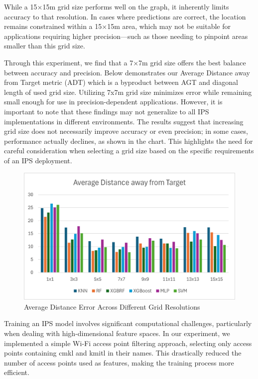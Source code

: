 \documentclass[conference]{IEEEtran}
\begin{document}
	While a 15×15m grid size performs well on the graph, it inherently limits accuracy to that resolution. In cases where predictions are correct, the location remains constrained within a 15×15m area, which may not be suitable for applications requiring higher precision—such as those needing to pinpoint areas smaller than this grid size.
	
	Through this experiment, we find that a 7×7m grid size offers the best balance between accuracy and precision. Below demonstrates our Average Distance away from Target metric (ADT) which is a byproduct between AGT and diagonal length of used grid size. Utilizing 7x7m grid size minimizes error while remaining small enough for use in precision-dependent applications. However, it is important to note that these findings may not generalize to all IPS implementations in different environments. The results suggest that increasing grid size does not necessarily improve accuracy or even precision; in some cases, performance actually declines, as shown in the chart. This highlights the need for careful consideration when selecting a grid size based on the specific requirements of an IPS deployment.
	
	
	\begin{figure}[htbp]
		\centerline{\includegraphics[scale=0.65]{image2.png}}
		\caption{Average Distance Error Across Different Grid Resolutions}
		\label{fig:Avg_dis_err}
	\end{figure}
	
	Training an IPS model involves significant computational challenges, particularly when dealing with high-dimensional feature spaces. In our experiment, we implemented a simple Wi-Fi access point filtering approach, selecting only access points containing cmkl and kmitl in their names. This drastically reduced the number of access points used as features, making the training process more efficient.
	
\end{document}
